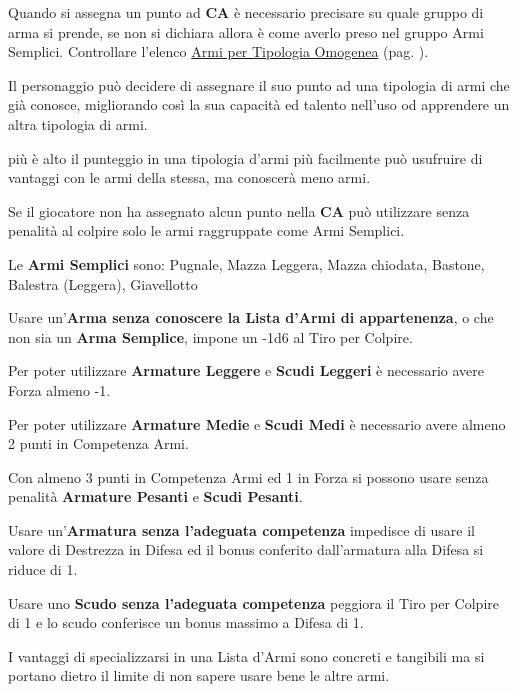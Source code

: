 \begin{multicols}{2}
Quando si assegna un punto ad \textbf{CA} è necessario precisare su quale gruppo di arma si prende, se non si dichiara allora è come averlo preso nel gruppo Armi Semplici.
Controllare l'elenco \hyperlink{lista.armi}{Armi per Tipologia Omogenea} (pag. \pageref{lista.armi}).

Il personaggio può decidere di assegnare il suo punto ad una tipologia di armi che già conosce, migliorando così la sua capacità ed talento nell'uso od apprendere un altra tipologia di armi.

più è alto il punteggio in una tipologia d'armi più facilmente può usufruire di vantaggi con le armi della stessa, ma conoscerà meno armi.

Se il giocatore non ha assegnato alcun punto nella \textbf{CA} può utilizzare senza penalità al colpire solo le armi raggruppate come Armi Semplici.

Le \textbf{Armi Semplici} sono: Pugnale, Mazza Leggera, Mazza chiodata, Bastone, Balestra (Leggera), Giavellotto

Usare un'\textbf{Arma senza conoscere la Lista d'Armi di appartenenza}, o che non sia un \textbf{Arma Semplice}, impone un -1d6 al Tiro per Colpire.

Per poter utilizzare \textbf{Armature Leggere} e \textbf{Scudi Leggeri} è necessario avere Forza almeno -1.\label{indossarearmature}\hypertarget{indossarearmature}{}

Per poter utilizzare \textbf{Armature Medie} e \textbf{Scudi Medi} è necessario avere almeno 2 punti in Competenza Armi.

Con almeno 3 punti in Competenza Armi ed 1 in Forza si possono usare senza penalità \textbf{Armature Pesanti} e \textbf{Scudi Pesanti}.

Usare un'\textbf{Armatura senza l'adeguata competenza} impedisce di usare il valore di Destrezza in Difesa ed il bonus conferito dall'armatura alla Difesa si riduce di 1.

Usare uno \textbf{Scudo senza l'adeguata competenza} peggiora il Tiro per Colpire di 1 e lo scudo conferisce un bonus massimo a Difesa di 1.


\begin{changemargin}{0.3cm}{0.3cm}\begin{tcolorbox}[title = Specializzarsi o meno in un arma]
I vantaggi di specializzarsi in una Lista d'Armi sono concreti e tangibili ma si portano dietro il limite di non sapere usare bene le altre armi.


\end{tcolorbox}
\end{changemargin}
\end{multicols}
